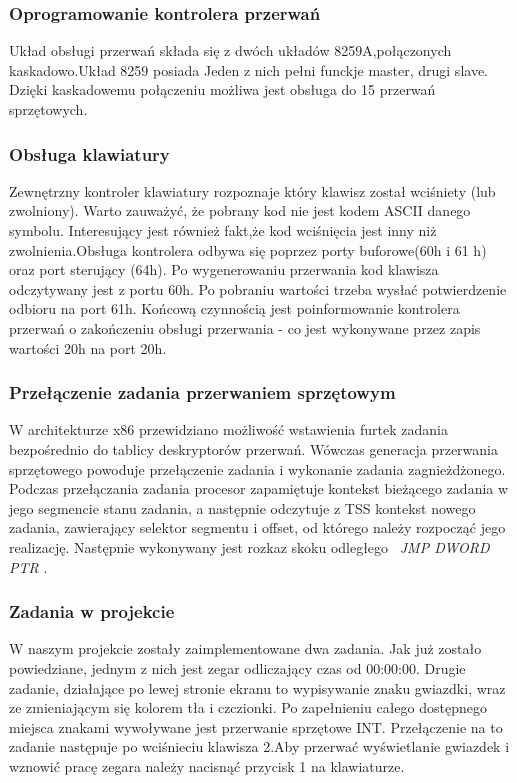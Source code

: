 \documentclass[a4paper,12pt]{article}
\begin{document}
		\subsubsection{Oprogramowanie kontrolera przerwań}
			Układ obsługi przerwań składa się z dwóch układów 8259A,połączonych kaskadowo.Układ 8259 posiada Jeden z nich pełni funckje master, drugi slave. Dzięki kaskadowemu połączeniu możliwa jest obsługa do 15 przerwań sprzętowych.  
		
		\subsubsection{Obsługa klawiatury}		
			Zewnętrzny kontroler klawiatury rozpoznaje który klawisz został wciśniety (lub zwolniony). Warto zauważyć, że pobrany kod nie jest kodem ASCII danego symbolu. Interesujący jest również fakt,że kod wciśnięcia jest inny niż zwolnienia.Obsługa kontrolera odbywa się poprzez porty buforowe(60h i 61 h) oraz port sterujący (64h). Po wygenerowaniu przerwania kod klawisza odczytywany jest z portu 60h. Po pobraniu wartości trzeba wysłać potwierdzenie odbioru na port 61h. Końcową czynnością jest poinformowanie kontrolera przerwań o zakończeniu obsługi przerwania - co jest wykonywane przez zapis wartości 20h na port 20h.
			\subsubsection{Przełączenie zadania przerwaniem sprzętowym}
			 W architekturze x86 przewidziano możliwość wstawienia furtek zadania bezpośrednio do tablicy deskryptorów przerwań. Wówczas generacja przerwania sprzętowego powoduje przełączenie zadania i wykonanie zadania zagnieżdżonego. Podczas przełączania zadania procesor zapamiętuje kontekst bieżącego zadania w jego segmencie stanu zadania, a następnie odczytuje z TSS kontekst nowego zadania, zawierający selektor segmentu i offset, od którego należy rozpocząć jego realizację.  Następnie wykonywany jest rozkaz skoku odległego ~\textit{JMP DWORD PTR }.
 	
	\subsubsection{Zadania w projekcie}
		W naszym projekcie zostały zaimplementowane dwa zadania. Jak już zostało powiedziane, jednym z nich jest  zegar odliczający czas od 00:00:00. Drugie zadanie, działające po lewej stronie ekranu to wypisywanie znaku gwiazdki, wraz ze zmieniającym się kolorem tła i czczionki. Po zapełnieniu całego dostępnego miejsca znakami wywoływane jest przerwanie sprzętowe INT.  Przełączenie na to zadanie następuje po wciśnieciu klawisza 2.Aby przerwać wyświetlanie gwiazdek i wznowić pracę zegara należy nacisnąć przycisk 1 na klawiaturze.
	
\end{document}

